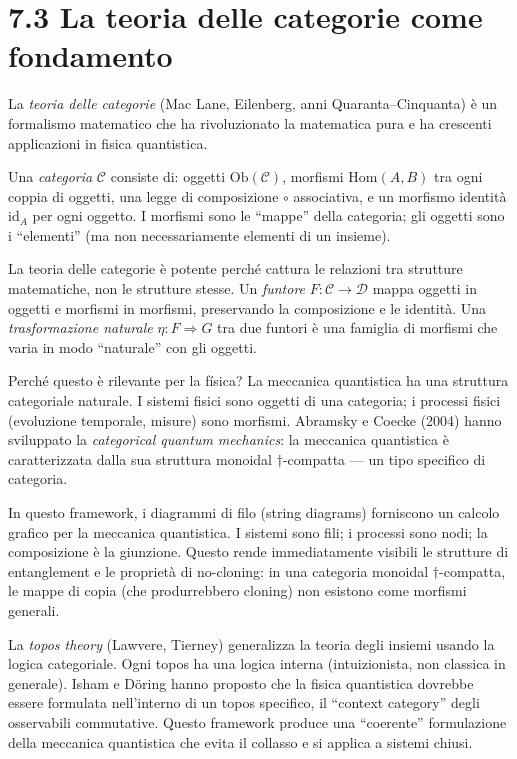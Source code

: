 \documentclass[11.5pt,a4paper,openany]{book}
\theoremstyle{remark}
\begin{document}
\section{7.3 La teoria delle categorie come fondamento}

La \textit{teoria delle categorie} (Mac Lane, Eilenberg, anni Quaranta--Cinquanta) è un formalismo matematico che ha rivoluzionato la matematica pura e ha crescenti applicazioni in fisica quantistica.

Una \textit{categoria} $\mathcal{C}$ consiste di: oggetti $\text{Ob}(\mathcal{C})$, morfismi $\text{Hom}(A,B)$ tra ogni coppia di oggetti, una legge di composizione $\circ$ associativa, e un morfismo identità $\text{id}_A$ per ogni oggetto. I morfismi sono le ``mappe'' della categoria; gli oggetti sono i ``elementi'' (ma non necessariamente elementi di un insieme).

La teoria delle categorie è potente perché cattura le relazioni tra strutture matematiche, non le strutture stesse. Un \textit{funtore} $F: \mathcal{C} \to \mathcal{D}$ mappa oggetti in oggetti e morfismi in morfismi, preservando la composizione e le identità. Una \textit{trasformazione naturale} $\eta: F \Rightarrow G$ tra due funtori è una famiglia di morfismi che varia in modo ``naturale'' con gli oggetti.

Perché questo è rilevante per la física? La meccanica quantistica ha una struttura categoriale naturale. I sistemi fisici sono oggetti di una categoria; i processi fisici (evoluzione temporale, misure) sono morfismi. Abramsky e Coecke (2004) hanno sviluppato la \textit{categorical quantum mechanics}: la meccanica quantistica è caratterizzata dalla sua struttura monoidal $\dagger$-compatta --- un tipo specifico di categoria.

In questo framework, i diagrammi di filo (string diagrams) forniscono un calcolo grafico per la meccanica quantistica. I sistemi sono fili; i processi sono nodi; la composizione è la giunzione. Questo rende immediatamente visibili le strutture di entanglement e le proprietà di no-cloning: in una categoria monoidal $\dagger$-compatta, le mappe di copia (che produrrebbero cloning) non esistono come morfismi generali.

La \textit{topos theory} (Lawvere, Tierney) generalizza la teoria degli insiemi usando la logica categoriale. Ogni topos ha una logica interna (intuizionista, non classica in generale). Isham e Döring hanno proposto che la fisica quantistica dovrebbe essere formulata nell'interno di un topos specifico, il ``context category'' degli osservabili commutative. Questo framework produce una ``coerente'' formulazione della meccanica quantistica che evita il collasso e si applica a sistemi chiusi.
\end{document}
